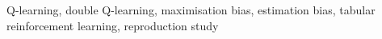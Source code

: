 Q-learning, double Q-learning, maximisation bias, estimation bias, tabular reinforcement learning, reproduction study
